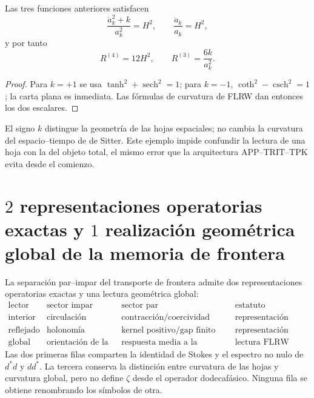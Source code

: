 \begin{proposition}
\label{prop:tres-foliaciones-rev6}
Las tres funciones anteriores satisfacen
\[
 \frac{\dot a_k^2+k}{a_k^2}=H^2,\qquad
 \frac{\ddot a_k}{a_k}=H^2,
\]
y por tanto
\[
 \boxed{\quad
 R^{(4)}=12H^2,\qquad
 R^{(3)}=\frac{6k}{a_k^2}.
 \quad}
\]
\end{proposition}

\begin{proof}
Para \(k=+1\) se usa
\(\tanh^2+\operatorname{sech}^2=1\); para \(k=-1\),
\(\coth^2-\operatorname{csch}^2=1\); la carta plana es inmediata.
Las fórmulas de curvatura de FLRW dan entonces los dos escalares.
\end{proof}

El signo \(k\) distingue la geometría de las hojas espaciales; no cambia la
curvatura del espacio--tiempo de de Sitter.  Este ejemplo impide confundir
la lectura de una hoja con la del objeto total, el mismo error que la
arquitectura APP--TRIT--TPK evita desde el comienzo.

\section{\(2\) representaciones operatorias exactas y \(1\) realización geométrica global de la memoria de frontera}

\begin{theorem}
\label{thm:una-memoria-tres-funciones}
La separación par--impar del transporte de frontera admite dos
representaciones operatorias exactas y una lectura geométrica global:
\[
\begin{array}{c|c|c|c}
\text{lector}&\text{sector impar}&\text{sector par}&\text{estatuto}\\ \hline
\text{interior}&\text{circulación}&\text{contracción/coercividad}
&\text{representación exacta}\\
\text{reflejado}&\text{holonomía}&\text{kernel positivo/gap finito}
&\text{representación exacta}\\
\text{global}&\text{orientación de la hoja}&
                \text{respuesta media a la expansión}
&\text{lectura FLRW tipada}
\end{array}
\]
Las dos primeras filas comparten la identidad de Stokes y el espectro no
nulo de \(d^\ast d\) y \(dd^\ast\).  La tercera conserva la distinción entre
curvatura de las hojas y curvatura global, pero no define \(\zeta\) desde el
operador dodecafásico. Ninguna fila se obtiene renombrando los símbolos de
otra.
\end{theorem}

